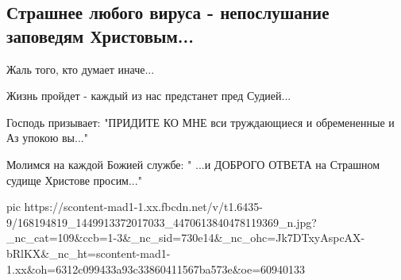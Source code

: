  
 
 
 
 

\subsection{Страшнее любого вируса - непослушание заповедям Христовым...}

Жаль того, кто думает иначе...

Жизнь пройдет - каждый из нас предстанет пред Судией...

Господь призывает: "ПРИДИТЕ КО МНЕ вси труждающиеся и обремененные и Аз упокою
вы..."

Молимся на каждой Божией службе: " ...и ДОБРОГО ОТВЕТА на Страшном судище
Христове просим..."

\ifcmt
  pic https://scontent-mad1-1.xx.fbcdn.net/v/t1.6435-9/168194819_1449913372017033_4470613840478119369_n.jpg?_nc_cat=109&ccb=1-3&_nc_sid=730e14&_nc_ohc=Jk7DTxyAspcAX-bRlKX&_nc_ht=scontent-mad1-1.xx&oh=6312c099433a93c33860411567ba573e&oe=60940133
\fi

